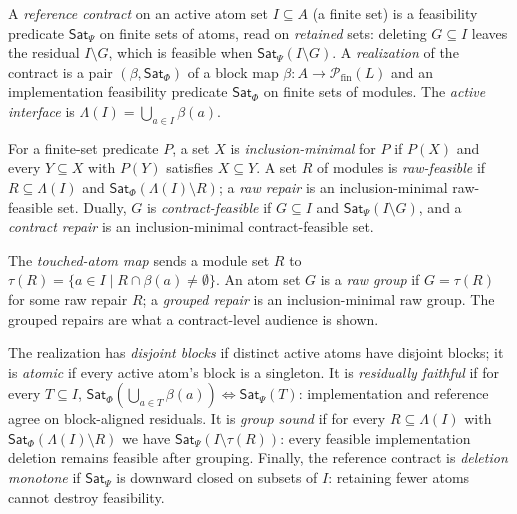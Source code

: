 \documentclass[sigplan,10pt,review,anonymous,nonacm]{acmart}
\theoremstyle{acmdefinition}
\newcommand{\Lam}{\Lambda}
\newcommand{\SatPsi}{{\mathsf{Sat}_\Psi}}
\newcommand{\SatPhi}{{\mathsf{Sat}_\Phi}}
\begin{document}
\begin{definition}
\label{def:contract}
A \emph{reference contract} on an active atom set $I \subseteq A$ (a finite
set) is a feasibility predicate $\SatPsi$ on finite sets of atoms, read on
\emph{retained} sets: deleting $G \subseteq I$ leaves the residual
$I \setminus G$, which is feasible when $\SatPsi(I \setminus G)$. A
\emph{realization} of the contract is a pair $(\beta, \SatPhi)$ of a block
map $\beta : A \to \mathcal{P}_{\mathrm{fin}}(L)$ and an implementation
feasibility predicate $\SatPhi$ on finite sets of modules. The \emph{active
interface} is $\Lam(I) = \bigcup_{a \in I} \beta(a)$.
\end{definition}

\begin{definition}
\label{def:repairs}
For a finite-set predicate $P$, a set $X$ is \emph{inclusion-minimal} for $P$
if $P(X)$ and every $Y \subseteq X$ with $P(Y)$ satisfies $X \subseteq Y$.
A set $R$ of modules is \emph{raw-feasible} if $R \subseteq \Lam(I)$ and
$\SatPhi(\Lam(I) \setminus R)$; a \emph{raw repair} is an inclusion-minimal
raw-feasible set. Dually, $G$ is \emph{contract-feasible} if $G \subseteq I$
and $\SatPsi(I \setminus G)$, and a \emph{contract repair} is an
inclusion-minimal contract-feasible set.
\end{definition}

\begin{definition}
\label{def:grouping}
The \emph{touched-atom map} sends a module set $R$ to
$\tau(R) = \{a \in I \mid R \cap \beta(a) \neq \emptyset\}$. An atom set $G$
is a \emph{raw group} if $G = \tau(R)$ for some raw repair $R$; a
\emph{grouped repair} is an inclusion-minimal raw group. The grouped repairs
are what a contract-level audience is shown.
\end{definition}

\begin{definition}
\label{def:hyps}
The realization has \emph{disjoint blocks} if distinct active atoms have
disjoint blocks; it is \emph{atomic} if every active atom's block is a
singleton. It is \emph{residually faithful} if for every $T \subseteq I$,
$\SatPhi(\bigcup_{a\in T}\beta(a)) \iff \SatPsi(T)$: implementation and
reference agree on block-aligned residuals. It is \emph{group sound} if for
every $R \subseteq \Lam(I)$ with $\SatPhi(\Lam(I) \setminus R)$ we have
$\SatPsi(I \setminus \tau(R))$: every feasible implementation deletion
remains feasible after grouping. Finally, the reference contract is
\emph{deletion monotone} if $\SatPsi$ is downward closed on subsets of $I$:
retaining fewer atoms cannot destroy feasibility.
\end{definition}
\end{document}
